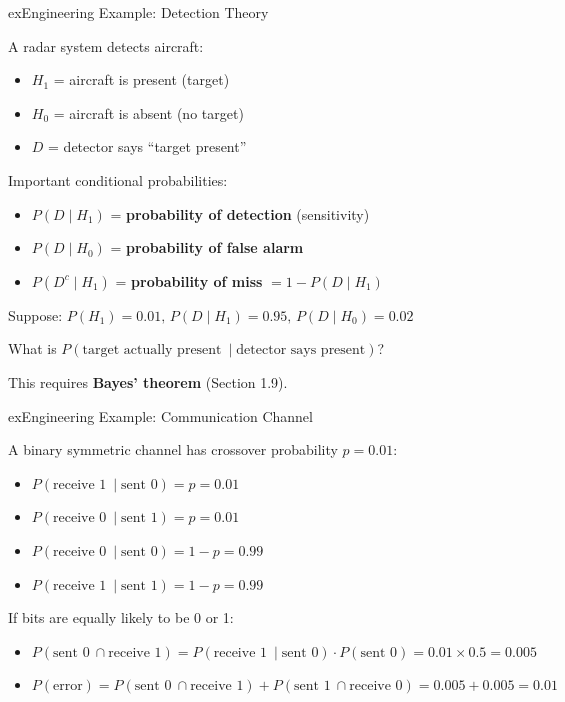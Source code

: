 \begin{PSbox}[unbreakable]{ex}{Engineering Example: Detection Theory}

A radar system detects aircraft:

\begin{itemize}
\tightlist
\item
  $H_{1}$ = aircraft is present (target)
\item
  $H_{0}$ = aircraft is absent (no target)
\item
  $D$ = detector says ``target present''
\end{itemize}

Important conditional probabilities:

\begin{itemize}
\tightlist
\item
  $P(D \mid H_{1})$ = \textbf{probability of detection} (sensitivity)
\item
  $P(D \mid H_{0})$ = \textbf{probability of false alarm}
\item
  $P(D^{c} \mid H_{1})$ = \textbf{probability of miss} $= 1 - P(D \mid H_{1})$
\end{itemize}

Suppose: $P(H_{1}) = 0.01,\, P(D \mid H_{1}) = 0.95,\, P(D \mid H_{0}) = 0.02$

What is $P(\text{target actually present}\ \mid \text{detector says present})$?

This requires \textbf{Bayes’ theorem} (Section 1.9).

\end{PSbox}

\begin{PSbox}[unbreakable]{ex}{Engineering Example: Communication Channel}

A binary symmetric channel has crossover probability $p = 0.01$:

\begin{itemize}
\tightlist
\item
  $P(\text{receive 1}\ \mid \text{sent 0}) = p = 0.01$
\item
  $P(\text{receive 0}\ \mid \text{sent 1}) = p = 0.01$
\item
  $P(\text{receive 0}\ \mid \text{sent 0}) = 1 - p = 0.99$
\item
  $P(\text{receive 1}\ \mid \text{sent 1}) = 1 - p = 0.99$
\end{itemize}

If bits are equally likely to be 0 or 1:

\begin{itemize}
\tightlist
\item
  $P(\text{sent 0}\ \cap \text{receive 1}) = P(\text{receive 1}\ \mid \text{sent 0}) \cdot P(\text{sent 0}) = 0.01 \times 0.5 = 0.005$
\item
  $P(\text{error}) = P(\text{sent 0}\ \cap \text{receive 1}) + P(\text{sent 1}\ \cap \text{receive 0}) = 0.005 + 0.005 = 0.01$
\end{itemize}

\end{PSbox}

